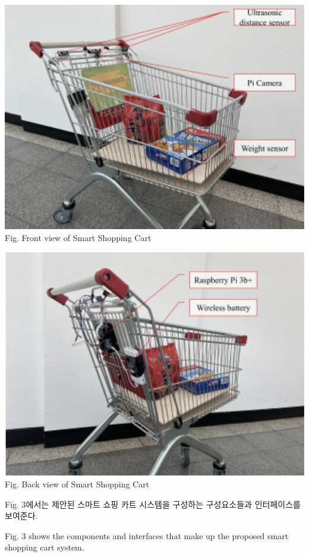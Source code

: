 \documentclass[smallextended]{svjour3}       %
\begin{document}
\includegraphics{../fig/fig1.png} Fig. Front view of Smart Shopping Cart

\includegraphics{../fig/fig2.png} Fig. Back view of Smart Shopping Cart

Fig. 3에서는 제안된 스마트 쇼핑 카트 시스템을 구성하는 구성요소들과
인터페이스를 보여준다.

Fig. 3 shows the components and interfaces that make up the proposed
smart shopping cart system.
\end{document}
